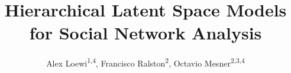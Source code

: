 \documentclass[final]{beamer}
\title{Hierarchical Latent Space Models for Social Network Analysis} %
\author{Alex Loewi\textsuperscript{1,4},
  Francisco Ralston\textsuperscript{2},
  Octavio Mesner\textsuperscript{2,3,4}} %
\institute{\textsuperscript{1}Public Policy,
  \textsuperscript{2}Engineering \& Public Policy,
  \textsuperscript{3}Statistics \& Data Science,
    \textsuperscript{4}Machine Learning
} %
\begin{document}
\newcommand\curly[1]{\left\{#1\right\}}
\newcommand\brac[1]{\left[#1\right]}
\newcommand\paren[1]{\left(#1\right)}
\newcommand\abs[1]{\left|#1\right|}
\newcommand\norm[1]{\left\|#1\right\|}
\newcommand\ang[1]{\left\langle#1\right\rangle}
\newcommand{\R}{\mathbb{R}}
\renewcommand{\P}{\mathbb{P}}
\newcommand{\N}{\mathbb{N}}
\newcommand{\bone}{\mathbf{1}}
\newcommand{\calL}{\mathcal{L}}
\newcommand{\logitinv}{\textrm{logit}^{-1}}


\setlength{\belowcaptionskip}{2ex} %
\setlength\belowdisplayshortskip{2ex} %
\end{document}
